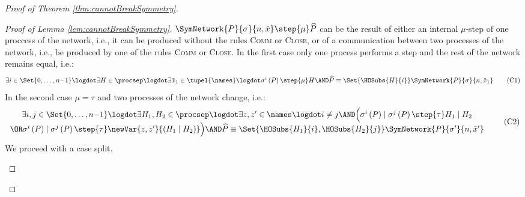 \documentclass[11pt,techReport]{eptcs}
\begin{document}
\begin{proof}[Proof of Theorem \ref{thm:cannotBreakSymmetry}]
\begin{proof}[Proof of Lemma \ref{lem:cannotBreakSymmetry}]
	$ \SymNetwork{P}{\sigma}{n, \tilde{x}} \step{\mu} \widehat{P} $ can be the result of either an internal $ \mu $-step of one proccess of the network, i.e., it can be produced without the rules \textsc{Comm} or \textsc{Close}, or of a communication between two processes of the network, i.e., be produced by one of the rules \textsc{Comm} or \textsc{Close}. In the first case only one process performs a step and the rest of the network remains equal, i.e.:
	\begin{align*}
		\exists i \in \Set{ 0, \ldots, n{-}1 } \logdot \exists H \in \procsep \logdot \exists \tilde{x}_1 \in \tupel{\names} \logdot \sigma^i\left( P \right) \step{\mu} H \AND \widehat{P} \equiv \Set{ \HOSubs{H}{i} }\SymNetwork{P}{\sigma}{n, \tilde{x}_1} \tag{C1} \label{caseC1}
	\end{align*}
	In the second case $ \mu = \tau $ and two processes of the network change, i.e.:
	\begin{align*}
		\begin{array}{c}
			\exists i, j \in \Set{ 0, \ldots, n{-}1 } \logdot \exists H_1, H_2 \in \procsep \logdot \exists z, z' \in \names \logdot i \neq j \AND \Big( \sigma^i\left( P \right) \mid \sigma^j\left( P \right) \step{\tau} H_1 \mid H_2\\
			\OR \sigma^i\left( P \right) \mid \sigma^j\left( P \right) \step{\tau} \newVar{z, z'}{\left( H_1 \mid H_2 \right)} \Big) \AND \widehat{P} \equiv \Set{ \HOSubs{H_1}{i}, \HOSubs{H_2}{j} }\SymNetwork{P}{\sigma'}{n, \tilde{x}'}
		\end{array} \tag{C2} \label{caseC2}
	\end{align*}
	We proceed with a case split.
	\begin{description}

\end{description}
\end{proof}
\end{proof}
\end{document}
